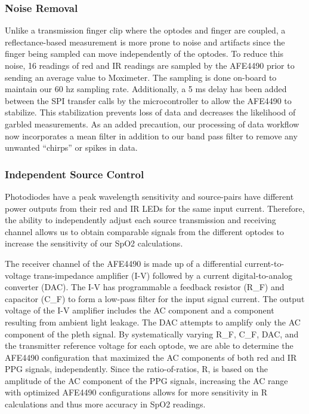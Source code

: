         \subsubsection{Noise Removal}
        Unlike a transmission finger clip where the optodes and finger are coupled, a reflectance-based measurement is more prone to noise and artifacts since the finger being sampled can move independently of the optodes. To reduce this noise, 16 readings of red and IR readings are sampled by the AFE4490 prior to sending an average value to Moximeter. The sampling is done on-board to maintain our 60 hz sampling rate. Additionally, a 5 ms delay has been added between the SPI transfer calls by the microcontroller to allow the AFE4490 to stabilize. This stabilization prevents loss of data and decreases the likelihood of garbled measurements. As an added precaution, our processing of data workflow now incorporates a mean filter in addition to our band pass filter to remove any unwanted “chirps” or spikes in data. 
        
        \subsubsection{Independent Source Control}
        Photodiodes have a peak wavelength sensitivity and source-pairs have different power outputs from their red and IR LEDs for the same input current. Therefore, the ability to independently adjust each source transmission and receiving channel allows us to obtain comparable signals from the different optodes to increase the sensitivity of our SpO2 calculations.

        The receiver channel of the AFE4490 is made up of a differential current-to-voltage trans-impedance amplifier (I-V) followed by a current digital-to-analog converter (DAC). The I-V has programmable a feedback resistor (R_F) and capacitor (C_F) to form a low-pass filter for the input signal current. The output voltage of the I-V amplifier includes the AC component and a component resulting from ambient light leakage. The DAC attempts to amplify only the AC component of the pleth signal.  By systematically varying R_F, C_F, DAC, and the transmitter reference voltage for each optode, we are able to determine the AFE4490 configuration that maximized the AC components of both red and IR PPG signals, independently. Since the ratio-of-ratios, R, is based on the amplitude of the AC component of the PPG signals, increasing the AC range with optimized AFE4490 configurations allows for more sensitivity in R calculations and thus more accuracy in SpO2 readings. 

